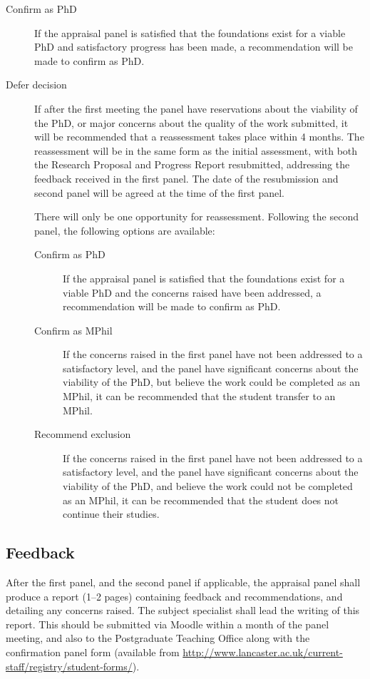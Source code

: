 \documentclass[12pt,a4paper]{article}
\begin{document}
\begin{description}
	\item[Confirm as PhD] If the appraisal panel is satisfied that the foundations exist for a viable PhD and satisfactory progress has been made, a recommendation will be made to confirm as PhD.
	\item[Defer decision] If after the first meeting the panel have reservations about the viability of the PhD, or major concerns about the quality of the work submitted, it will be recommended that a reassessment takes place within 4 months. The reassessment will be in the same form as the initial assessment, with both the Research Proposal and Progress Report resubmitted, addressing the feedback received in the first panel. The date of the resubmission and second panel will be agreed at the time of the first panel.
	
	There will only be one opportunity for reassessment. Following the second panel, the following options are available:
	\begin{description}
		\item[Confirm as PhD] If the appraisal panel is satisfied that the foundations exist for a viable PhD and the concerns raised have been addressed, a recommendation will be made to confirm as PhD.
		\item[Confirm as MPhil] If the concerns raised in the first panel have not been addressed to a satisfactory level, and the panel have significant concerns about the viability of the PhD, but believe the work could be completed as an MPhil, it can be recommended that the student transfer to an MPhil.
		\item[Recommend exclusion] If the concerns raised in the first panel have not been addressed to a satisfactory level, and the panel have significant concerns about the viability of the PhD, and believe the work could not be completed as an MPhil, it can be recommended that the student does not continue their studies.
	\end{description}
\end{description}

\subsection{Feedback}
After the first panel, and the second panel if applicable, the appraisal panel shall produce a report (1--2 pages) containing feedback and recommendations, and detailing any concerns raised. The subject specialist shall lead the writing of this report. This should be submitted via Moodle within a month of the panel meeting, and also to the Postgraduate Teaching Office along with the confirmation panel form (available from \url{http://www.lancaster.ac.uk/current-staff/registry/student-forms/}).
\end{document}
